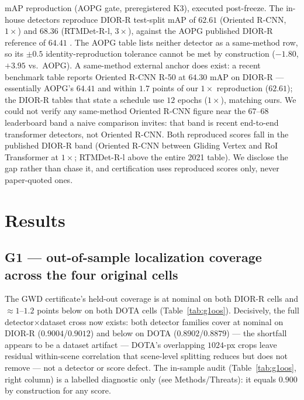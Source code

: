 \documentclass[journal]{IEEEtran}
\begin{document}
mAP reproduction (AOPG gate, preregistered K3), executed post-freeze. The in-house detectors reproduce
DIOR-R test-split mAP of $62.61$ (Oriented R-CNN, $1\times$) and $68.36$ (RTMDet-R-l, $3\times$), against the
AOPG published DIOR-R reference of $64.41$ \citep{cheng2022diorr}. The AOPG table lists neither detector as a
same-method row, so its $\pm0.5$ identity-reproduction tolerance cannot be met by construction ($-1.80$,
$+3.95$ vs.\ AOPG). A same-method external anchor does exist: a recent benchmark table reports Oriented R-CNN
R-50 at $64.30$ mAP on DIOR-R \citep{ding2026rtoriented} --- essentially AOPG's $64.41$ and within $1.7$ points
of our $1\times$ reproduction ($62.61$); the DIOR-R tables that state a schedule use $12$ epochs ($1\times$),
matching ours. We could not verify any same-method Oriented R-CNN figure near the $67$--$68$ leaderboard
band a naive comparison invites: that band is recent end-to-end transformer detectors, not Oriented R-CNN.
Both reproduced scores fall in the published DIOR-R band (Oriented R-CNN between Gliding Vertex and RoI
Transformer at $1\times$; RTMDet-R-l above the entire 2021 table). We disclose the gap rather than chase it,
and certification uses reproduced scores only, never paper-quoted ones.

\section{Results}\label{sec:results}
\subsection{G1 --- out-of-sample localization coverage across the four original cells}
The GWD certificate's held-out coverage is at nominal on both DIOR-R cells and $\approx1$--$1.2$ points below
on both DOTA cells (Table~\ref{tab:g1oos}). Decisively, the full detector$\times$dataset cross now exists:
both detector families cover at nominal on DIOR-R ($0.9004$/$0.9012$) and below on DOTA
($0.8902$/$0.8879$) --- the shortfall appears to be a dataset artifact --- DOTA's
overlapping $1024$-px crops leave residual within-scene correlation that scene-level splitting reduces but does
not remove --- not a detector or score defect. The in-sample audit (Table~\ref{tab:g1oos}, right column) is a
labelled diagnostic only (see Methods/Threats): it equals $0.900$ by construction for any score.
\end{document}
